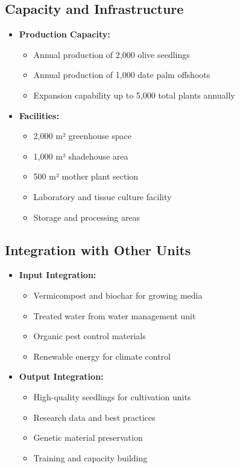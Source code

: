 \subsection{Capacity and Infrastructure}
\begin{itemize}
    \item \textbf{Production Capacity:}
    \begin{itemize}
        \item Annual production of 2,000 olive seedlings
        \item Annual production of 1,000 date palm offshoots
        \item Expansion capability up to 5,000 total plants annually
    \end{itemize}
    
    \item \textbf{Facilities:}
    \begin{itemize}
        \item 2,000 m² greenhouse space
        \item 1,000 m² shadehouse area
        \item 500 m² mother plant section
        \item Laboratory and tissue culture facility
        \item Storage and processing areas
    \end{itemize}
\end{itemize}

\subsection{Integration with Other Units}
\begin{itemize}
    \item \textbf{Input Integration:}
    \begin{itemize}
        \item Vermicompost and biochar for growing media
        \item Treated water from water management unit
        \item Organic pest control materials
        \item Renewable energy for climate control
    \end{itemize}
    
    \item \textbf{Output Integration:}
    \begin{itemize}
        \item High-quality seedlings for cultivation units
        \item Research data and best practices
        \item Genetic material preservation
        \item Training and capacity building
    \end{itemize}
\end{itemize}

